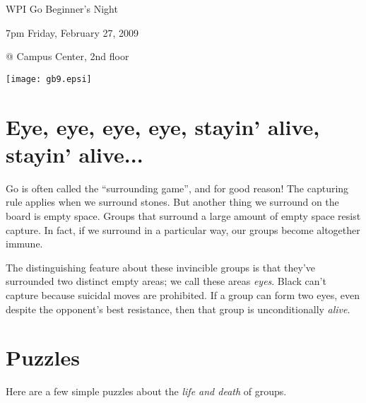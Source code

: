 \documentclass{article}
\begin{document}
\centerline{\Huge WPI Go Beginner's Night}
\centerline{\Huge 7pm Friday, February 27, 2009}
\centerline{\Huge @ Campus Center, 2nd floor}
\vfill

\begin{center}
\texttt{[image: gb9.epsi]}
\end{center}

\vfill

\newpage

\section*{Eye, eye, eye, eye, stayin' alive, stayin' alive...}

Go is often called the ``surrounding game'', and for good reason!  The
capturing rule applies when we surround stones.  But another thing we
surround on the board is empty space.  Groups that surround a large
amount of empty space resist capture.  In fact, if we surround in a
particular way, our groups become altogether immune.
\begin{center}
\hspace{.2in}
\hspace{.2in}
%
%
\hspace{.2in}
\end{center}
The distinguishing feature about these invincible groups is that
they've surrounded two distinct empty areas; we call these areas
\emph{eyes}.  Black can't capture because suicidal moves are
prohibited.  If a group can form two eyes, even despite the opponent's
best resistance, then that group is unconditionally \emph{alive}.


\section*{Puzzles}
Here are a few simple puzzles about the \emph{life and death} of groups.
\begin{center}
\hspace{.3in}
\hspace{.3in}
\end{center}
\end{document}
